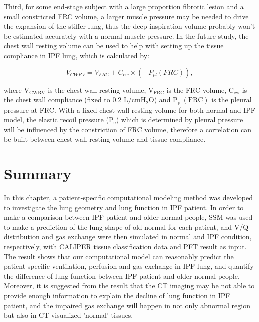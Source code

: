 Third, for some end-stage subject with a large proportion fibrotic lesion and a small constricted FRC volume, a larger muscle pressure may be needed to drive the expansion of the stiffer lung, thus the deep inspiration volume probably won't be estimated accurately with a normal muscle pressure. In the future study, the chest wall resting volume can be used to help with setting up the tissue compliance in IPF lung, which is calculated by:

\begin{equation} 
 \label{eq:ChestWallRestingVolume}
 V_{CWRV} = V_{FRC} + C_{cw} \times (-P_{pl}(FRC)),
\end{equation} 

\noindent where $\mathrm{V_{CWRV}}$ is the chest wall resting volume,  $\mathrm{V_{FRC}}$ is the FRC volume, $\mathrm{C_{cw}}$ is the chest wall compliance (fixed to 0.2 $\mathrm{L/cmH_2O}$) and $\mathrm{P_{pl}(FRC)}$ is the pleural pressure at FRC. With a fixed chest wall resting volume for both normal and IPF model, the elastic recoil pressure ($\mathrm{P_e}$) which is determined by pleural pressure will be influenced by the constriction of FRC volume, therefore a correlation can be built between chest wall resting volume and tissue compliance.

\section{Summary}
In this chapter, a patient-specific computational modeling method was developed to investigate the lung geometry and lung function in IPF patient. In order to make a comparison between IPF patient and older normal people, SSM was used to make a prediction of the lung shape of old normal for each patient, and V/Q distribution and gas exchange were then simulated in normal and IPF condition, respectively, with CALIPER tissue classification data and PFT result as input. The result shows that our computational model can reasonably predict the patient-specific ventilation, perfusion and gas exchange in IPF lung, and quantify the difference of lung function between IPF patient and older normal people. Moreover, it is suggested from the result that the CT imaging may be not able to provide enough information to explain the decline of lung function in IPF patient, and the impaired gas exchange will happen in not only abnormal region but also in CT-visualized 'normal' tissues.
